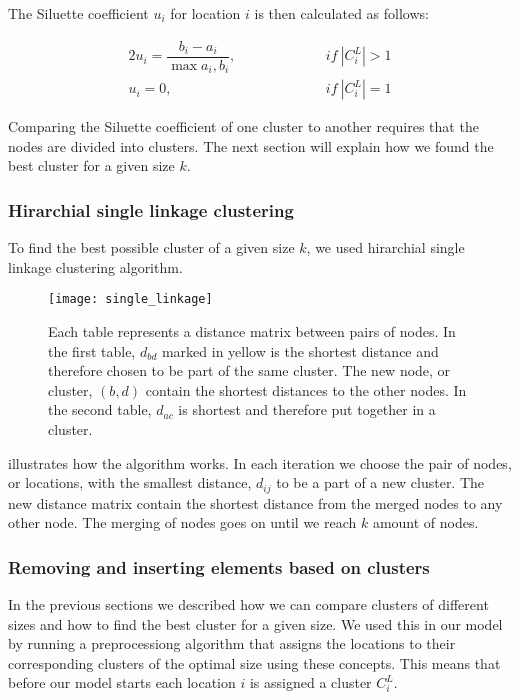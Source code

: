 \documentclass[../main.tex]{subfiles}
\begin{document}
The Siluette coefficient $u_i$ for location $i$ is then calculated as follows: 

\begin{alignat} {2}
    \label{eq:siluette}
    u_i = \dfrac{b_i-a_i}{\max{a_i,b_i}}, &\quad\quad\quad\quad&& if\ |C^L_i|>1 \label{eq:siluette}\\
    u_i = 0,& && if\ |C^L_i| = 1 \nonumber
\end{alignat}

Comparing the Siluette coefficient of one cluster to another requires that the nodes are divided into clusters. 
The next section will explain how we found the best cluster for a given size $k$.

\subsubsection{Hirarchial single linkage clustering}
To find the best possible cluster of a given size $k$, we used hirarchial single linkage clustering algorithm.

\begin{figure}                                                                                     
    \centering                                                                                 
    \texttt{[image: single\_linkage]}                                     
    \caption{Each table represents a distance matrix between pairs of nodes. In the first table, $d_{bd}$ marked in yellow is the shortest distance and therefore chosen to be part of the same cluster. The new node, or cluster, $(b,d)$ contain the shortest distances to the other nodes. In the second table, $d_{ac}$ is shortest and therefore put together in a cluster.}
    \label{fig:hierarch}
\end{figure}

 illustrates how the algorithm works. 
In each iteration we choose the pair of nodes, or locations, with the smallest distance, $d_{ij}$ to be a part of a new cluster. The new distance matrix contain the shortest distance from the merged nodes to any other node. The merging of nodes goes on until we reach $k$ amount of nodes.

\subsubsection{Removing and inserting elements based on clusters}
In the previous sections we described how we can compare clusters of different sizes and how to find the best cluster for a given size. 
We used this in our model by running a preprocessiong algorithm that assigns the locations to their corresponding clusters of the optimal size using these concepts.
This means that before our model starts each location $i$ is assigned a cluster $C^L_i$. \par
\end{document}
